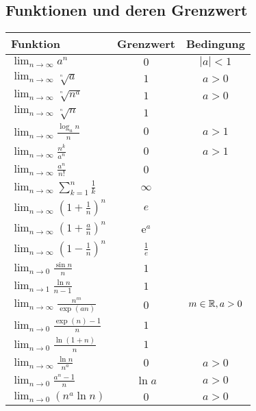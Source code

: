 \subsection{Funktionen und deren Grenzwert}
\begin{tabular}{l | c | c}
    Funktion & Grenzwert & Bedingung\\\hline
    $\lim_{n \to \infty} a^n$ & $0$ & $|a| < 1$\\\hline
    $\lim_{n \to \infty} \sqrt[^n]{a}$ & $1$ & $a > 0$\\\hline
    $\lim_{n \to \infty} \sqrt[^n]{n^a}$ & $1$ & $a > 0$\\\hline
    $\lim_{n \to \infty} \sqrt[^n]{n}$ & $1$\\\hline
    $\lim_{n \to \infty} \frac{\log_an}{n}$ & $0$ & $a > 1$\\\hline
    $\lim_{n \to \infty} \frac{n^k}{a^n}$ & $0$ & $a > 1$\\\hline
    $\lim_{n \to \infty} \frac{a^n}{n!}$ & $0$\\\hline
    $\lim_{n \to \infty} \sum_{k=1}^{n} \frac{1}{k}$ & $\infty$\\\hline
    $\lim_{n \to \infty} \left( 1 + \frac{1}{n} \right)^n$ & $e$\\\hline
    $\lim_{n \to \infty} \left( 1 + \frac{a}{n} \right)^n$ &e$^a$\\\hline
    $\lim_{n \to \infty} \left( 1 - \frac{1}{n} \right)^n$ & $\frac{1}{e}$\\\hline
    $\lim_{n \to 0} \frac{\sin n}{n}$ & $1$\\\hline
    $\lim_{n \to 1} \frac{\ln n}{n - 1}$ & $1$\\\hline
    $\lim_{n \to \infty} \frac{n^m}{\exp(an)}$ & $0$ & $m \in \mathbb{R}, a > 0$\\\hline
    $\lim_{n \to 0} \frac{\exp(n) - 1}{n}$ & $1$\\\hline
    $\lim_{n \to 0} \frac{\ln(1 + n)}{n}$ & $1$\\\hline
    $\lim_{n \to \infty} \frac{\ln n}{n^a}$ & $0$ & $a > 0$\\\hline
    $\lim_{n \to 0} \frac{a^n - 1}{n}$ & $\ln a$ & $a > 0$\\\hline
    $\lim_{n \to 0} (n^a \ln n)$ & $0$ & $a > 0$\\\hline
\end{tabular}

